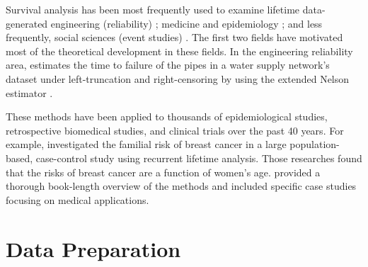 Survival analysis has been most frequently used to examine lifetime data-generated engineering (reliability) \citep{lawless2011,meeker2014,holt2011}; medicine and epidemiology \citep{kalbfleisch2011}; and less frequently, social sciences (event studies) \citep{allison2010,long2006}.  The first two fields have motivated most of the theoretical development in these fields. 
In the engineering reliability area, \citet{carrion2010} estimates the time to failure of the pipes in a water supply network's dataset under left-truncation and right-censoring by using the extended Nelson estimator \citep{pan1998}.

These methods have been applied to thousands of epidemiological studies, retrospective biomedical studies, and clinical trials over the past 40 years. For example, \citet{claus1991} investigated the familial risk of breast cancer in a large population-based, case-control study using recurrent lifetime analysis. Those researches found that the risks of breast cancer are a function of women's age.  \citet{Kleinmoeschberger2003} provided a thorough book-length overview of the methods and included specific case studies focusing on medical applications.
\section{Data Preparation}\label{data.desc}

